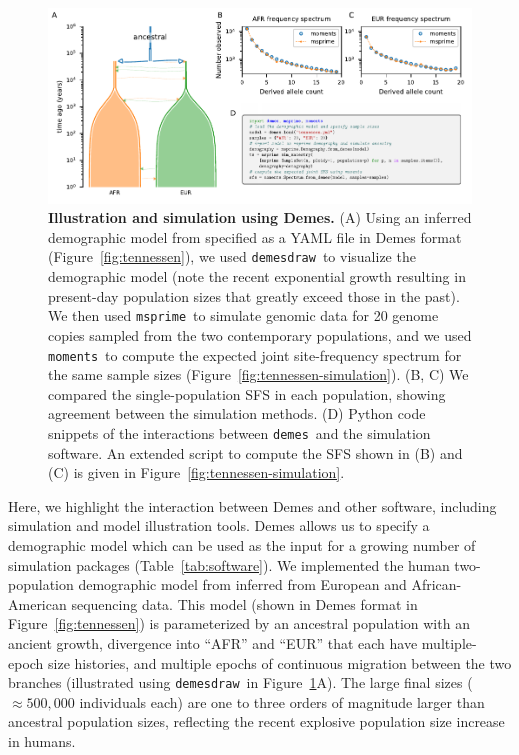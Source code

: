 \documentclass[11pt]{article}
\newcommand{\msprime}[0]{\texttt{msprime}}
\newcommand{\demes}[0]{\texttt{demes}}
\newcommand{\demesdraw}[0]{\texttt{demesdraw}}
\newcommand{\moments}[0]{\texttt{moments}}
\begin{document}
\begin{figure}[tb!]
    \centering
    \includegraphics{fig/showcase}
    \caption{
        \textbf{Illustration and simulation using Demes.}
        (A)
        Using an inferred demographic model from \citet{tennessen2012evolution}
        specified as a YAML file in Demes format (Figure~\ref{fig:tennessen}), we
        used \demesdraw\ to visualize the demographic model (note the recent
            exponential growth resulting in present-day population sizes that
        greatly exceed those in the past).
        We then used \msprime\ to simulate genomic data for 20 genome copies
        sampled from the two contemporary populations, and we used \moments\
        to compute the expected joint site-frequency spectrum for the same
        sample sizes (Figure~\ref{fig:tennessen-simulation}).
        (B, C) We compared the single-population SFS in each population, showing
        agreement between the simulation methods.
        (D) Python code snippets of the interactions between \demes\ and the simulation
        software. An extended script to compute the SFS shown in (B) and (C) is
        given in Figure~\ref{fig:tennessen-simulation}.
    }
    \label{fig:showcase}
\end{figure}

Here, we highlight the interaction between Demes and other software, including
simulation and model illustration tools. Demes allows us to specify a
demographic model which can be used as the input for a growing
number of simulation packages (Table~\ref{tab:software}). We implemented the
human two-population demographic model from \citet{tennessen2012evolution}
inferred from European and African-American sequencing data. This model (shown
in Demes format in Figure~\ref{fig:tennessen}) is parameterized by an ancestral
population with an ancient growth, divergence into ``AFR'' and ``EUR'' that
each have multiple-epoch size histories, and multiple epochs of continuous
migration between the two branches (illustrated using \demesdraw\ in
Figure~\ref{fig:showcase}A). The large final sizes (\(\approx 500,000\)
individuals each) are one to three orders of magnitude larger than ancestral
population sizes, reflecting the recent explosive population size increase in
humans.
\end{document}
